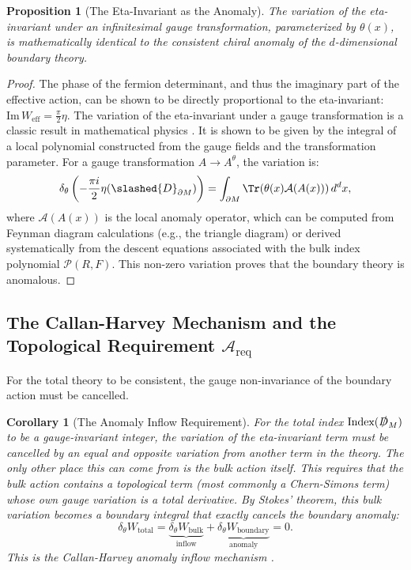 \documentclass[11pt, letterpaper]{report}
\theoremstyle{plain} %
\newtheorem{proposition}[theorem]{Proposition}
\newtheorem{corollary}[theorem]{Corollary}
\theoremstyle{definition} %
\theoremstyle{remark} %
\newcommand{\BulkM}{M}
\newcommand{\BoundaryM}{\partial\BulkM}
\newcommand{\DiracOpBulk}{\slashed{D}_{\BulkM}}
\newcommand{\DiracOpBoundary}{\slashed{D}_{\BoundaryM}}
\newcommand{\EtaInv}{\eta}
\newcommand{\Index}{\text{Index}}
\newcommand{\AnomPoly}{\mathcal{A}}
\begin{document}
\begin{proposition}[The Eta-Invariant as the Anomaly]
\label{prop:eta_invariant_anomaly_full_detail}
The variation of the eta-invariant under an infinitesimal gauge transformation, parameterized by $\theta(x)$, is mathematically identical to the consistent chiral anomaly of the $d$-dimensional boundary theory.
\end{proposition}
\begin{proof}
The phase of the fermion determinant, and thus the imaginary part of the effective action, can be shown to be directly proportional to the eta-invariant: $\text{Im}\,W_{\text{eff}} = \frac{\pi}{2}\EtaInv$. The variation of the eta-invariant under a gauge transformation is a classic result in mathematical physics \cite{AlvarezGaume1985Anomalies,Nakahara2003}. It is shown to be given by the integral of a local polynomial constructed from the gauge fields and the transformation parameter. For a gauge transformation $A \to A^\theta$, the variation is:
\begin{equation}
    \delta_\theta \left( -\frac{\pi i}{2} \EtaInv(\DiracOpBoundary) \right) = \int_{\BoundaryM} \Tr(\theta(x) \AnomPoly(A(x))) \, d^dx,
\end{equation}
where $\AnomPoly(A(x))$ is the local anomaly operator, which can be computed from Feynman diagram calculations (e.g., the triangle diagram) or derived systematically from the descent equations associated with the bulk index polynomial $\mathcal{P}(R,F)$. This non-zero variation proves that the boundary theory is anomalous.
\end{proof}

\subsection{The Callan-Harvey Mechanism and the Topological Requirement \texorpdfstring{$\mathcal{A}_{\text{req}}$}{A_req}}
\label{subsec:callan_harvey_formal}

For the total theory to be consistent, the gauge non-invariance of the boundary action must be cancelled.

\begin{corollary}[The Anomaly Inflow Requirement]
\label{cor:anomaly_inflow_requirement_full_detail}
For the total index $\Index(\DiracOpBulk)$ to be a gauge-invariant integer, the variation of the eta-invariant term must be cancelled by an equal and opposite variation from another term in the theory. The only other place this can come from is the bulk action itself. This requires that the bulk action contains a topological term (most commonly a Chern-Simons term) whose own gauge variation is a total derivative. By Stokes' theorem, this bulk variation becomes a boundary integral that exactly cancels the boundary anomaly:
\begin{equation}
    \delta_\theta W_{\text{total}} = \underbrace{\delta_\theta W_{\text{bulk}}}_{\text{inflow}} + \underbrace{\delta_\theta W_{\text{boundary}}}_{\text{anomaly}} = 0.
\end{equation}
This is the Callan-Harvey anomaly inflow mechanism \cite{CallanHarvey1985}.
\end{corollary}
\end{document}
